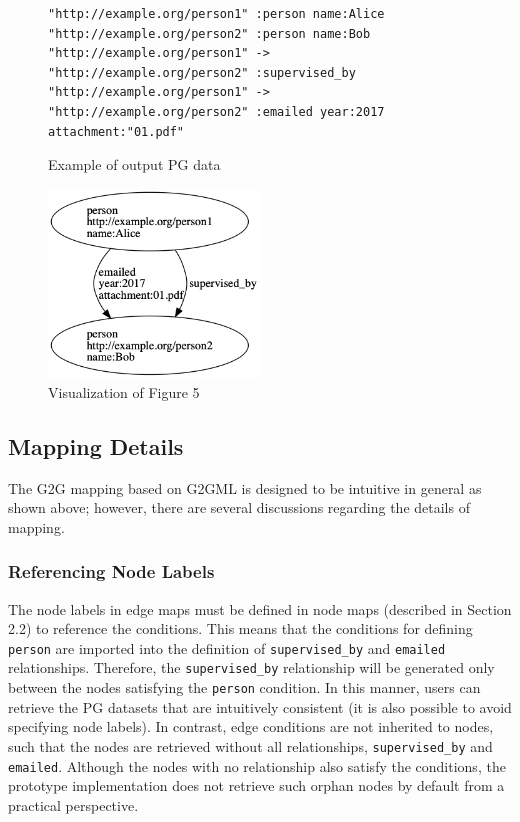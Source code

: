 \documentclass[runningheads]{llncs}
\begin{document}
\begin{figure}[!t]
\begin{scriptsize}
\begin{verbatim}
"http://example.org/person1" :person name:Alice
"http://example.org/person2" :person name:Bob
"http://example.org/person1" -> "http://example.org/person2" :supervised_by
"http://example.org/person1" -> "http://example.org/person2" :emailed year:2017 attachment:"01.pdf"
\end{verbatim}
\end{scriptsize}
\caption{Example of output PG data}
\label{fig:example-pg}
\end{figure}


\begin{figure}
\center
\includegraphics[width=0.5\textwidth]{pg_example5.png}
\caption{Visualization of Figure 5}
\label{fig:pg_example5}
\end{figure}

\subsection{Mapping Details}
\label{subsec:mapping-details}
The G2G mapping based on G2GML is designed to be intuitive in general as shown above; however, there are several discussions regarding the details of mapping.

\subsubsection{Referencing Node Labels}
The node labels in edge maps must be defined in node maps (described in Section 2.2) to reference the conditions. This means that the conditions for defining \texttt{person} are imported into the definition of \texttt{supervised\_by} and \texttt{emailed} relationships. Therefore, the \texttt{supervised\_by} relationship will be generated only between the nodes satisfying the \texttt{person} condition. In this manner, users can retrieve the PG datasets that are intuitively consistent (it is also possible to avoid specifying node labels). In contrast, edge conditions are not inherited to nodes, such that the nodes are retrieved without all relationships, \texttt{supervised\_by} and \texttt{emailed}. Although the nodes with no relationship also satisfy the conditions, the prototype implementation does not retrieve such orphan nodes by default from a practical perspective.
\end{document}
